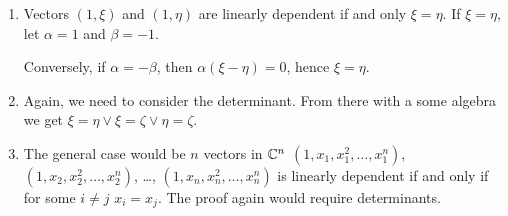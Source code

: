 \begin{solution}
  \begin{enumerate}[label=(\alph*)]
    \item Vectors $(1, \xi)$ and $(1, \eta)$ are linearly dependent if and only $\xi = \eta$.
      If $\xi = \eta$, let $\alpha = 1$ and $\beta = -1$.
      
      Conversely, if $\alpha = -\beta$, then $\alpha(\xi - \eta) = 0$, hence $\xi = \eta$.
    \item Again, we need to consider the determinant.
      From there with a some algebra we get $\xi = \eta \vee \xi = \zeta \vee \eta = \zeta$.
    \item The general case would be $n$ vectors in $\mathbb{C}^n$ $(1, x_1, x_1^2, \ldots, x_1^n)$, $(1, x_2, x_2^2, \ldots, x_2^n)$, \ldots, $(1, x_n, x_n^2, \ldots, x_n^n)$ is linearly dependent if and only if for some $i \neq j$ $x_i = x_j$.
      The proof again would require determinants.
  \end{enumerate}
\end{solution}
